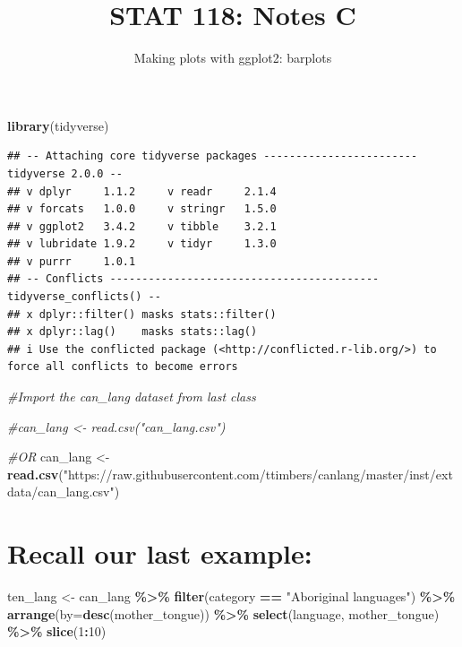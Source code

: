 \documentclass[
]{article}
\title{STAT 118: Notes C}
\subtitle{Making plots with ggplot2: barplots}
\author{}
\date{\vspace{-2.5em}}
\newenvironment{Shaded}{\begin{snugshade}}{\end{snugshade}}
\newcommand{\AttributeTok}[1]{\textcolor[rgb]{0.13,0.29,0.53}{#1}}
\newcommand{\CommentTok}[1]{\textcolor[rgb]{0.56,0.35,0.01}{\textit{#1}}}
\newcommand{\DecValTok}[1]{\textcolor[rgb]{0.00,0.00,0.81}{#1}}
\newcommand{\FunctionTok}[1]{\textcolor[rgb]{0.13,0.29,0.53}{\textbf{#1}}}
\newcommand{\NormalTok}[1]{#1}
\newcommand{\OtherTok}[1]{\textcolor[rgb]{0.56,0.35,0.01}{#1}}
\newcommand{\SpecialCharTok}[1]{\textcolor[rgb]{0.81,0.36,0.00}{\textbf{#1}}}
\newcommand{\StringTok}[1]{\textcolor[rgb]{0.31,0.60,0.02}{#1}}
\begin{document}
\maketitle

\begin{Shaded}
\begin{Highlighting}[]
\FunctionTok{library}\NormalTok{(tidyverse)}
\end{Highlighting}
\end{Shaded}

\begin{verbatim}
## -- Attaching core tidyverse packages ------------------------ tidyverse 2.0.0 --
## v dplyr     1.1.2     v readr     2.1.4
## v forcats   1.0.0     v stringr   1.5.0
## v ggplot2   3.4.2     v tibble    3.2.1
## v lubridate 1.9.2     v tidyr     1.3.0
## v purrr     1.0.1     
## -- Conflicts ------------------------------------------ tidyverse_conflicts() --
## x dplyr::filter() masks stats::filter()
## x dplyr::lag()    masks stats::lag()
## i Use the conflicted package (<http://conflicted.r-lib.org/>) to force all conflicts to become errors
\end{verbatim}

\begin{Shaded}
\begin{Highlighting}[]
\CommentTok{\#Import the can\_lang dataset from last class}

\CommentTok{\#can\_lang \textless{}{-} read.csv("can\_lang.csv")}

\CommentTok{\#OR}
\NormalTok{can\_lang }\OtherTok{\textless{}{-}} \FunctionTok{read.csv}\NormalTok{(}\StringTok{"https://raw.githubusercontent.com/ttimbers/canlang/master/inst/extdata/can\_lang.csv"}\NormalTok{)}
\end{Highlighting}
\end{Shaded}

\hypertarget{recall-our-last-example}{%
\section{Recall our last example:}\label{recall-our-last-example}}

\begin{Shaded}
\begin{Highlighting}[]
\NormalTok{ten\_lang }\OtherTok{\textless{}{-}}\NormalTok{ can\_lang }\SpecialCharTok{\%\textgreater{}\%} 
  \FunctionTok{filter}\NormalTok{(category }\SpecialCharTok{==} \StringTok{"Aboriginal languages"}\NormalTok{) }\SpecialCharTok{\%\textgreater{}\%}
  \FunctionTok{arrange}\NormalTok{(}\AttributeTok{by=}\FunctionTok{desc}\NormalTok{(mother\_tongue)) }\SpecialCharTok{\%\textgreater{}\%}
  \FunctionTok{select}\NormalTok{(language, mother\_tongue) }\SpecialCharTok{\%\textgreater{}\%}
  \FunctionTok{slice}\NormalTok{(}\DecValTok{1}\SpecialCharTok{:}\DecValTok{10}\NormalTok{)}
\end{Highlighting}
\end{Shaded}
\end{document}
